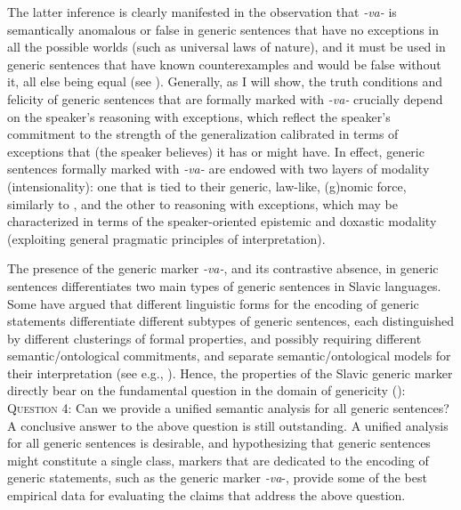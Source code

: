 \documentclass[output=paper,colorlinks,citecolor=brown]{langscibook}
\begin{document}
The latter inference
is clearly manifested in the observation that 
\textit{-va-} is semantically anomalous or false in generic sentences that have no exceptions in all the possible worlds (such as universal laws of nature), and it must be used in generic sentences that have known counterexamples
and would be false without it, all else being equal (see ). 
Generally, as I will show, 
the truth conditions and felicity of generic sentences that are formally marked with \textit{-va-} crucially depend on the speaker's reasoning with exceptions, which reflect the 
speaker's commitment
to the strength of the generalization calibrated in terms of exceptions that (the speaker believes) it has or might have.
In effect, generic sentences formally marked with \textit{-va-} are 
endowed with two layers of modality (intensionality): one that is tied to their generic, law-like, (g)nomic force, similarly to ,
and the other to reasoning with exceptions, which 
may be characterized in terms of the speaker-oriented epistemic and doxastic modality (exploiting general pragmatic principles of interpretation). 

The presence of the generic marker \textit{-va-}, and its contrastive absence, in generic sentences differentiates two main types of generic sentences in Slavic languages.
Some have argued that different linguistic forms for the encoding of generic statements differentiate different subtypes of generic sentences, each distinguished by different clusterings of formal properties, and possibly requiring different semantic/ontological commitments, and separate semantic/ontological models for their interpretation
(see e.g., \citealt{greenberg2003manifestations,pelletier-equal2009,krifka2012definitional, boneh2013hab, boneh2008habituality}). 
Hence, the properties of the Slavic generic marker 
directly bear on the fundamental question in the domain of genericity 
(\citealt{carlson1977unified,carlson1995truth}): \\

\noindent
\textsc{Question 4}: Can we provide a unified semantic analysis for all generic sentences? \\

\noindent 
A conclusive answer to the above question is still outstanding. A unified analysis for all generic sentences is desirable, and hypothesizing that
generic sentences might constitute a single class, 
markers that are dedicated to the encoding of generic statements, such as the generic marker \textit{-va}-, provide some of the best empirical data for evaluating the claims that address the above 
question.
\end{document}
